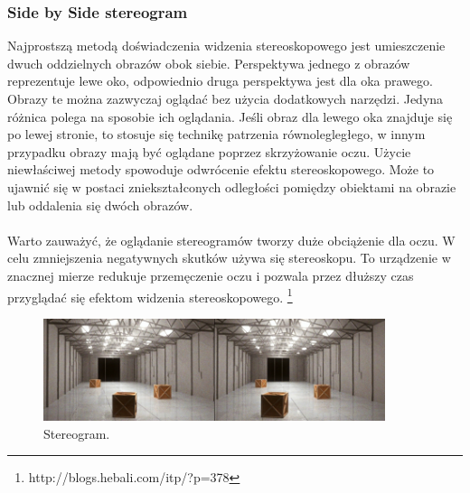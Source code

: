 \subsubsection{Side by Side stereogram}
Najprostszą metodą doświadczenia widzenia stereoskopowego jest umieszczenie dwuch oddzielnych obrazów obok siebie. Perspektywa jednego z obrazów reprezentuje lewe oko, odpowiednio druga perspektywa jest dla oka prawego. Obrazy te można zazwyczaj oglądać bez użycia dodatkowych narzędzi. Jedyna różnica polega na sposobie ich oglądania. Jeśli obraz dla lewego oka znajduje się po lewej stronie, to stosuje się technikę patrzenia równolegległego, w innym przypadku obrazy mają być oglądane poprzez skrzyżowanie oczu. Użycie niewłaściwej metody spowoduje odwrócenie efektu stereoskopowego. Może to ujawnić się w postaci zniekształconych odległości pomiędzy obiektami na obrazie lub oddalenia się dwóch obrazów. \paragraph{} 
Warto zauważyć, że oglądanie stereogramów tworzy duże obciążenie dla oczu. W celu zmniejszenia negatywnych skutków używa się stereoskopu. To urządzenie w znacznej mierze redukuje przemęczenie oczu i pozwala przez dłuższy czas przyglądać się efektom widzenia stereoskopowego.
\footnote{http://blogs.hebali.com/itp/?p=378}
\begin{figure}[H]
		\centering
 		\includegraphics[width=10cm]{sbs.jpg}
    	\caption{Stereogram.}
 		\label{rys1}
\end{figure}

